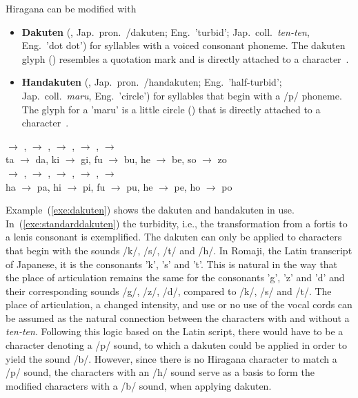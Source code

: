 Hiragana can be modified with
\begin{itemize}

  \item \textbf{Dakuten} (, Jap.\ pron.\ /dakuten;
        Eng.\ 'turbid'; Jap.\ coll.\ \emph{ten-ten}, Eng.\ 'dot dot') for 
        syllables with a voiced consonant phoneme. The dakuten glyph ()  
        resembles a quotation mark and is directly attached to a 
        character~.

  \item \textbf{Handakuten} (,
        Jap.\ pron.\ /handakuten; 
        Eng.\ 'half-turbid'; Jap.\ coll.\ \emph{maru}, Eng.\ 'circle') for 
        syllables that begin 
        with a /p/ phoneme. The glyph for a 'maru' is a little circle ()
        that is directly attached to a character~.

\end{itemize}
\begin{exe}
\ex \label{exe:dakuten}
\begin{xlist}
\ex \label{exe:standarddakuten}
\gll {} $\rightarrow$ ,  $\rightarrow$ ,  $\rightarrow$ ,  $\rightarrow$ ,  $\rightarrow$  \\
ta $\rightarrow$ da, ki $\rightarrow$ gi, fu $\rightarrow$ bu, he $\rightarrow$ be, so $\rightarrow$ zo \\

\ex \label{exe:handakuten}
\gll {} $\rightarrow$ ,  $\rightarrow$ ,  $\rightarrow$ ,  $\rightarrow$ ,  $\rightarrow$  \\
ha $\rightarrow$ pa, hi $\rightarrow$ pi, fu $\rightarrow$ pu, he $\rightarrow$ pe, ho $\rightarrow$ po \\
\end{xlist}
\end{exe}
Example~(\ref{exe:dakuten}) shows the dakuten and handakuten in use. 
In~(\ref{exe:standarddakuten}) the turbidity, i.e., the transformation from a 
fortis to a lenis consonant is exemplified. 
The dakuten can only be applied to characters that begin with the sounds 
/k/, /s/, /t/ and /h/. In Romaji, the Latin transcript of Japanese, it is
the consonants 'k', 's' and 't'. This is natural in the
way that the place of articulation remains the same for the consonants 'g', 'z' 
and 'd' and their corresponding sounds /g/, /z/, /d/, 
compared to /k/, /s/ and /t/.
The place of articulation, a changed intensity, and use or no use of the vocal 
cords can be assumed as the natural connection between the characters with and 
without a \emph{ten-ten}. 
Following this logic based on the Latin script, 
there would have to be a character denoting a /p/ sound,
to which a dakuten could be applied in order to yield the sound /b/.
However, since there is no Hiragana character to match a /p/ sound,
the characters with an /h/ sound serve as a basis to form the modified 
characters with a /b/ sound, when applying dakuten.

